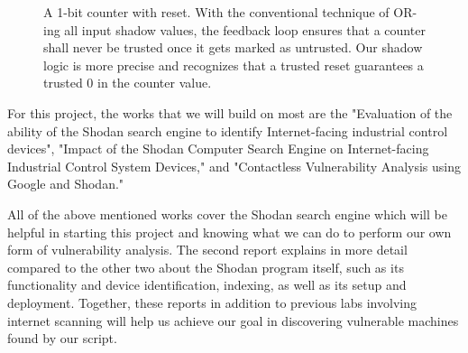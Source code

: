 \begin{figure}[t]
\begin{center}
\vspace{-0.2in}
\caption{A 1-bit counter with reset. With the conventional technique of OR-ing all input shadow values, the feedback loop ensures that a 
counter shall never be trusted once it gets marked as untrusted. Our shadow logic is more precise and recognizes that a trusted reset 
guarantees a trusted $0$ in the counter value.}
\label{fig:1bcounter}
\end{center}
\end{figure}

For this project, the works that we will build on most are the "Evaluation of the ability of the Shodan search engine to identify Internet-facing industrial control devices",
"Impact of the Shodan Computer Search Engine on Internet-facing Industrial Control System Devices," and "Contactless Vulnerability Analysis using Google and Shodan."

All of the above mentioned works cover the Shodan search engine which will be helpful in starting this project and knowing what we can do to perform our own form of vulnerability analysis.
The second report explains in more detail compared to the other two about the Shodan program itself, such as its functionality and device identification, indexing, as well as its setup and deployment.
Together, these reports in addition to previous labs involving internet scanning will help us achieve our goal in discovering vulnerable machines found by our script.